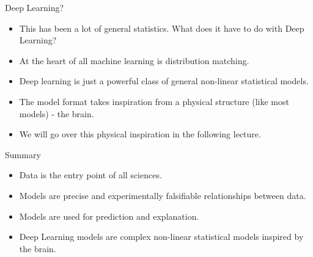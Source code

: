 \documentclass[
  ignorenonframetext,
]{beamer}
\begin{document}
\begin{frame}{Deep Learning?}
\protect\hypertarget{deep-learning}{}
\begin{itemize}
\item
  This has been a lot of general statistics. What does it have to do
  with Deep Learning?
\item
  At the heart of all machine learning is distribution matching.
\item
  Deep learning is just a powerful class of general non-linear
  statistical models.
\item
  The model format takes inspiration from a physical structure (like
  most models) - the brain.
\item
  We will go over this physical inspiration in the following lecture.
\end{itemize}
\end{frame}

\begin{frame}{Summary}
\protect\hypertarget{summary}{}
\begin{itemize}
\item
  Data is the entry point of all sciences.
\item
  Models are precise and experimentally falsifiable relationships
  between data.
\item
  Models are used for prediction and explanation.
\item
  Deep Learning models are complex non-linear statistical models
  inspired by the brain.
\end{itemize}
\end{frame}
\end{document}
